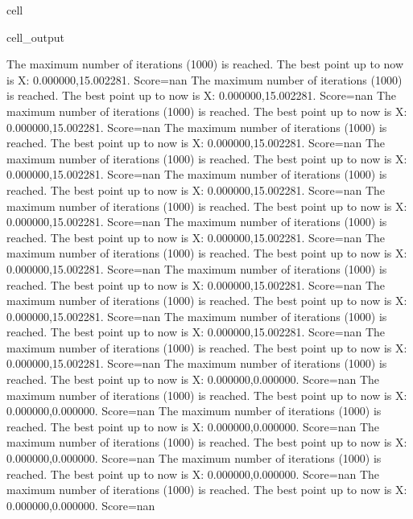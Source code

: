 \documentclass[letterpaper,10pt,english]{jupyterBook}
\begin{document}
\begin{sphinxuseclass}{cell}
\begin{sphinxVerbatimOutput}
\begin{sphinxuseclass}{cell_output}
\begin{sphinxVerbatim}[commandchars=\\\{\}]
The maximum number of iterations (1000) is reached. The best point up to now is X: \PYGZob{}0.000000,15.002281\PYGZcb{}. Score=\PYGZhy{}nan
The maximum number of iterations (1000) is reached. The best point up to now is X: \PYGZob{}0.000000,15.002281\PYGZcb{}. Score=\PYGZhy{}nan
The maximum number of iterations (1000) is reached. The best point up to now is X: \PYGZob{}0.000000,15.002281\PYGZcb{}. Score=\PYGZhy{}nan
The maximum number of iterations (1000) is reached. The best point up to now is X: \PYGZob{}0.000000,15.002281\PYGZcb{}. Score=\PYGZhy{}nan
The maximum number of iterations (1000) is reached. The best point up to now is X: \PYGZob{}0.000000,15.002281\PYGZcb{}. Score=\PYGZhy{}nan
The maximum number of iterations (1000) is reached. The best point up to now is X: \PYGZob{}0.000000,15.002281\PYGZcb{}. Score=\PYGZhy{}nan
The maximum number of iterations (1000) is reached. The best point up to now is X: \PYGZob{}0.000000,15.002281\PYGZcb{}. Score=\PYGZhy{}nan
The maximum number of iterations (1000) is reached. The best point up to now is X: \PYGZob{}0.000000,15.002281\PYGZcb{}. Score=\PYGZhy{}nan
The maximum number of iterations (1000) is reached. The best point up to now is X: \PYGZob{}0.000000,15.002281\PYGZcb{}. Score=\PYGZhy{}nan
The maximum number of iterations (1000) is reached. The best point up to now is X: \PYGZob{}0.000000,15.002281\PYGZcb{}. Score=\PYGZhy{}nan
The maximum number of iterations (1000) is reached. The best point up to now is X: \PYGZob{}0.000000,15.002281\PYGZcb{}. Score=\PYGZhy{}nan
The maximum number of iterations (1000) is reached. The best point up to now is X: \PYGZob{}0.000000,15.002281\PYGZcb{}. Score=\PYGZhy{}nan
The maximum number of iterations (1000) is reached. The best point up to now is X: \PYGZob{}0.000000,15.002281\PYGZcb{}. Score=\PYGZhy{}nan
The maximum number of iterations (1000) is reached. The best point up to now is X: \PYGZob{}0.000000,0.000000\PYGZcb{}. Score=\PYGZhy{}nan
The maximum number of iterations (1000) is reached. The best point up to now is X: \PYGZob{}0.000000,0.000000\PYGZcb{}. Score=\PYGZhy{}nan
The maximum number of iterations (1000) is reached. The best point up to now is X: \PYGZob{}0.000000,0.000000\PYGZcb{}. Score=\PYGZhy{}nan
The maximum number of iterations (1000) is reached. The best point up to now is X: \PYGZob{}0.000000,0.000000\PYGZcb{}. Score=\PYGZhy{}nan
The maximum number of iterations (1000) is reached. The best point up to now is X: \PYGZob{}0.000000,0.000000\PYGZcb{}. Score=\PYGZhy{}nan
The maximum number of iterations (1000) is reached. The best point up to now is X: \PYGZob{}0.000000,0.000000\PYGZcb{}. Score=\PYGZhy{}nan

\end{sphinxVerbatim}
\end{sphinxuseclass}
\end{sphinxVerbatimOutput}
\end{sphinxuseclass}
\end{document}
